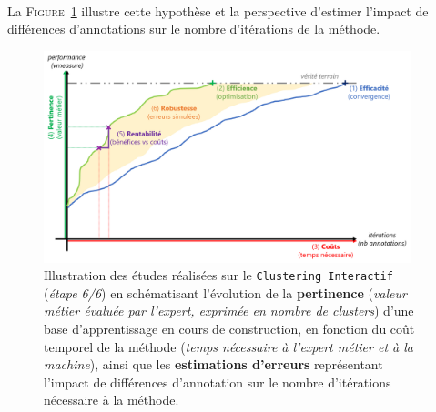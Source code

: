 	\begin{tcolorbox}[
		title=\faVial~\textbf{Hypothèse de robustesse}~\faVial,
		colback=colorTcolorboxHypothesis!15,
		colframe=colorTcolorboxHypothesis!75,
		width=\linewidth
	]
		 \\
		
		La \textsc{Figure~\ref{figure:4.6-HYPOTHESE-ROBUSTESSE}} illustre cette hypothèse et la perspective d'estimer l'impact de différences d'annotations sur le nombre d'itérations de la méthode.
		\begin{figure}[H]  %
			\centering
			\includegraphics[width=0.95\textwidth]{figures/hypotheses-06-robustesse}
			\caption{
				Illustration des études réalisées sur le \texttt{Clustering Interactif} (\textit{étape 6/6}) en schématisant l'évolution de la \textbf{pertinence} (\textit{valeur métier évaluée par l'expert, exprimée en nombre de clusters}) d'une base d'apprentissage en cours de construction, en fonction du coût temporel de la méthode (\textit{temps nécessaire à l'expert métier et à la machine}), ainsi que les \textbf{estimations d'erreurs} représentant l'impact de différences d'annotation sur le nombre d'itérations nécessaire à la méthode.
			}
			\label{figure:4.6-HYPOTHESE-ROBUSTESSE}
		\end{figure}
	\end{tcolorbox}
	
